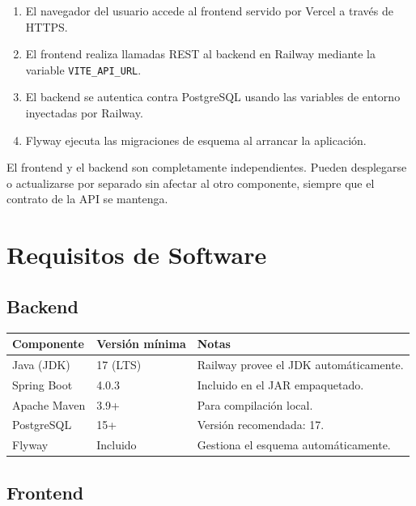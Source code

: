 \documentclass[11pt, a4paper]{article}
\begin{document}
\begin{enumerate}
  \item El navegador del usuario accede al frontend servido por Vercel a través de HTTPS.
  \item El frontend realiza llamadas REST al backend en Railway mediante la variable \texttt{VITE\_API\_URL}.
  \item El backend se autentica contra PostgreSQL usando las variables de entorno inyectadas por Railway.
  \item Flyway ejecuta las migraciones de esquema al arrancar la aplicación.
\end{enumerate}

\begin{notabox}
El frontend y el backend son completamente independientes. Pueden desplegarse o actualizarse por separado sin afectar al otro componente, siempre que el contrato de la API se mantenga.
\end{notabox}

\section{Requisitos de Software}

\subsection{Backend}

\begin{center}
\begin{tabular}{L{5cm} L{4cm} L{4.5cm}}
\toprule
\textbf{Componente} & \textbf{Versión mínima} & \textbf{Notas} \\
\midrule
Java (JDK)             & 17 (LTS)    & Railway provee el JDK automáticamente. \\
Spring Boot            & 4.0.3       & Incluido en el JAR empaquetado. \\
Apache Maven           & 3.9+        & Para compilación local. \\
PostgreSQL             & 15+         & Versión recomendada: 17. \\
Flyway                 & Incluido    & Gestiona el esquema automáticamente. \\
\bottomrule
\end{tabular}
\end{center}

\subsection{Frontend}
\end{document}
